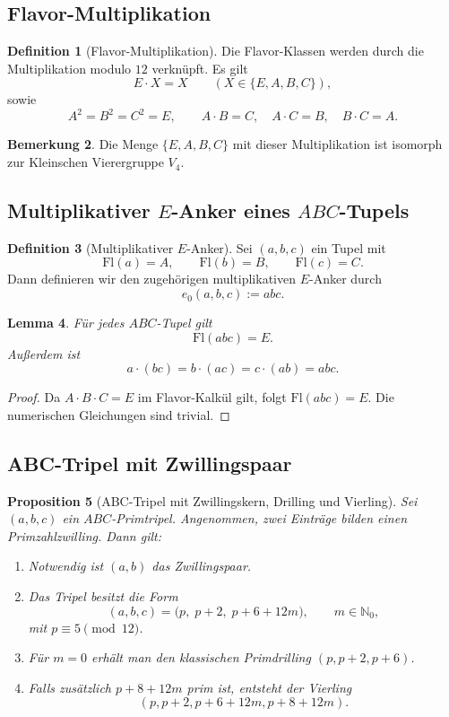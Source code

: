 \documentclass[11pt,a4paper]{article}
\theoremstyle{definition}
\newtheorem{definition}{Definition}[section]
\newtheorem{remark}[definition]{Bemerkung}
\theoremstyle{plain}
\newtheorem{proposition}[definition]{Proposition}
\newtheorem{lemma}[definition]{Lemma}
\begin{document}
	\subsection{Flavor-Multiplikation}
	
	\begin{definition}[Flavor-Multiplikation]
		Die Flavor-Klassen werden durch die Multiplikation modulo $12$ verknüpft. Es gilt
		\[
		E\cdot X=X\qquad (X\in\{E,A,B,C\}),
		\]
		sowie
		\[
		A^2=B^2=C^2=E,
		\qquad
		A\cdot B=C,\quad A\cdot C=B,\quad B\cdot C=A.
		\]
	\end{definition}
	
	\begin{remark}
		Die Menge $\{E,A,B,C\}$ mit dieser Multiplikation ist isomorph zur Kleinschen Vierergruppe $V_4$.
	\end{remark}
	
	\subsection{Multiplikativer $E$-Anker eines $ABC$-Tupels}
	
	\begin{definition}[Multiplikativer $E$-Anker]
		Sei $(a,b,c)$ ein Tupel mit
		\[
		\mathrm{Fl}(a)=A,\qquad \mathrm{Fl}(b)=B,\qquad \mathrm{Fl}(c)=C.
		\]
		Dann definieren wir den zugehörigen multiplikativen $E$-Anker durch
		\[
		e_0(a,b,c):=abc.
		\]
	\end{definition}
	
	\begin{lemma}
		Für jedes $ABC$-Tupel gilt
		\[
		\mathrm{Fl}(abc)=E.
		\]
		Außerdem ist
		\[
		a\cdot(bc)=b\cdot(ac)=c\cdot(ab)=abc.
		\]
	\end{lemma}
	
	\begin{proof}
		Da $A\cdot B\cdot C=E$ im Flavor-Kalkül gilt, folgt $\mathrm{Fl}(abc)=E$. Die numerischen Gleichungen sind trivial.
	\end{proof}
	
	\subsection{ABC-Tripel mit Zwillingspaar}
	
	\begin{proposition}[ABC-Tripel mit Zwillingskern, Drilling und Vierling]
		Sei $(a,b,c)$ ein $ABC$-Primtripel. Angenommen, zwei Einträge bilden einen Primzahlzwilling. Dann gilt:
		\begin{enumerate}[label=(\arabic*)]
			\item Notwendig ist $(a,b)$ das Zwillingspaar.
			\item Das Tripel besitzt die Form
			\[
			(a,b,c)=\bigl(p,\;p+2,\;p+6+12m\bigr),\qquad m\in\mathbb N_0,
			\]
			mit $p\equiv 5\pmod{12}$.
			\item Für $m=0$ erhält man den klassischen Primdrilling $(p,p+2,p+6)$.
			\item Falls zusätzlich $p+8+12m$ prim ist, entsteht der Vierling
			\[
			(p,p+2,p+6+12m,p+8+12m).
			\]
		\end{enumerate}
	\end{proposition}
	
\end{document}
